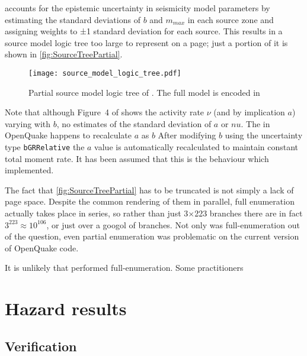 \documentclass{article}
\begin{document}
\cite{nath2012probabilistic} accounts for the epistemic uncertainty in seismicity model parameters by estimating the standard deviations of $b$ and $m_{max}$ in each source zone and assigning weights to ±1 standard deviation for each source.
This results in a source model logic tree too large to represent on a page; just a portion of it is shown in \autoref{fig:SourceTreePartial}.

\begin{figure}
\begin{adjustbox}{center}
\texttt{[image: source\_model\_logic\_tree.pdf]}
\end{adjustbox}
\caption[Partial source model logic tree]{Partial source model logic tree of \cite{nath2012probabilistic}.
The full model is encoded in \texttt{}}
\label{fig:SourceTreePartial}
\end{figure}

Note that although Figure~4 of \cite{nath2012probabilistic} shows the activity rate $\nu$ (and by implication $a$) varying with $b$, no estimates of the standard deviation of $a$ or $nu$.
The  in OpenQuake happens to recalculate $a$ as $b$ After modifying $b$ using the uncertainty type \texttt{bGRRelative} the $a$ value is automatically recalculated to maintain constant total moment rate.
It has been assumed that this is the behaviour which \cite{nath2012probabilistic} implemented.

The fact that \autoref{fig:SourceTreePartial} has to be truncated is not simply a lack of page space.
Despite the common rendering of them in parallel, full enumeration actually takes place in series, so rather than just 3$\times$223 branches there are in fact $3^{223} \approx 10^106$, or just over a googol of branches.
Not only was full-enumeration out of the question, even partial enumeration was problematic on the current version of OpenQuake code.

It is unlikely that \cite{nath2012probabilistic} performed full-enumeration.
Some practitioners 

\section{Hazard results}
\label{sec:Results}

\subsection{Verification}
\label{subsec:Verification}
\end{document}
